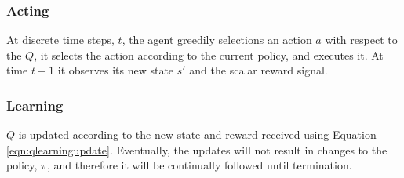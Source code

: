 \subsubsection{Acting}
At discrete time steps, $t$, the agent greedily selections an action $a$ with respect to the $Q$, it selects the action according to the current policy, and executes it. At time $t+1$ it observes its new state $s'$ and the scalar reward signal.
\subsubsection{Learning}
$Q$ is updated according to the new state and reward received using Equation \ref{eqn:qlearningupdate}. Eventually, the updates will not result in changes to the policy, $\pi$, and therefore it will be continually followed until termination.
